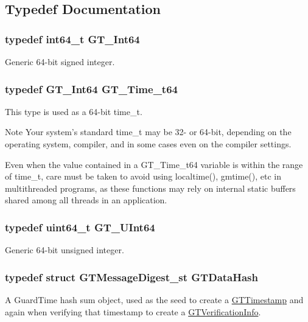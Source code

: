 \subsection{Typedef Documentation}
\hypertarget{group__common_ga0c05c3a051f674d7bf4df22831a3b5f3}{
\subsubsection[{GT\_\-Int64}]{\setlength{\rightskip}{0pt plus 5cm}typedef int64\_\-t {\bf GT\_\-Int64}}}
\label{group__common_ga0c05c3a051f674d7bf4df22831a3b5f3}
Generic 64-\/bit signed integer. \hypertarget{group__common_ga4cc54826c21e0ed438d8e35be7039328}{
\subsubsection[{GT\_\-Time\_\-t64}]{\setlength{\rightskip}{0pt plus 5cm}typedef {\bf GT\_\-Int64} {\bf GT\_\-Time\_\-t64}}}
\label{group__common_ga4cc54826c21e0ed438d8e35be7039328}
This type is used as a 64-\/bit {\ttfamily time\_\-t}.

\begin{DoxyNote}{Note}
Your system's standard {\ttfamily time\_\-t} may be 32-\/ or 64-\/bit, depending on the operating system, compiler, and in some cases even on the compiler settings.

Even when the value contained in a {\ttfamily GT\_\-Time\_\-t64} variable is within the range of {\ttfamily time\_\-t}, care must be taken to avoid using {\ttfamily localtime()}, {\ttfamily gmtime()}, etc in multithreaded programs, as these functions may rely on internal static buffers shared among all threads in an application. 
\end{DoxyNote}
\hypertarget{group__common_gab05f0d6e953c4aee143ec3063384dd77}{
\subsubsection[{GT\_\-UInt64}]{\setlength{\rightskip}{0pt plus 5cm}typedef uint64\_\-t {\bf GT\_\-UInt64}}}
\label{group__common_gab05f0d6e953c4aee143ec3063384dd77}
Generic 64-\/bit unsigned integer. \hypertarget{group__common_ga96461884b56b666a19e99b5c872eb2a6}{
\subsubsection[{GTDataHash}]{\setlength{\rightskip}{0pt plus 5cm}typedef struct {\bf GTMessageDigest\_\-st}  {\bf GTDataHash}}}
\label{group__common_ga96461884b56b666a19e99b5c872eb2a6}
A GuardTime hash sum object, used as the seed to create a \hyperlink{group__timestamps_gaddb792efe52216386853c94e7aeaf6ba}{GTTimestamp} and again when verifying that timestamp to create a \hyperlink{group__verification_ga54ec3cb4a9e8bdfd7400116440e23b36}{GTVerificationInfo}.

